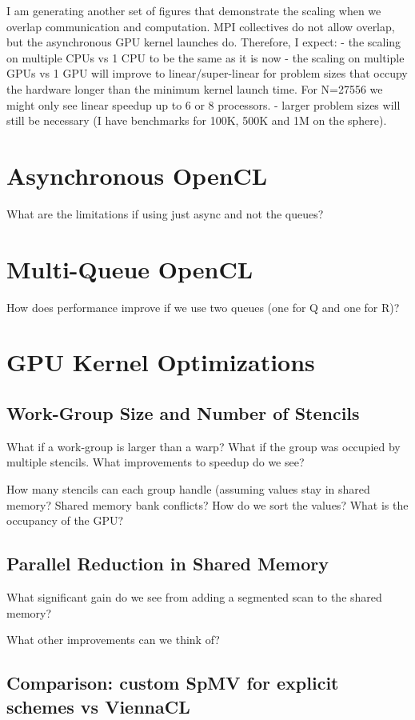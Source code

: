 I am generating another set of figures that demonstrate the scaling when we overlap communication and computation. MPI collectives do not allow overlap, but the asynchronous GPU kernel launches do. Therefore, I expect:
    - the scaling on multiple CPUs vs 1 CPU to be the same as it is now
    - the scaling on multiple GPUs vs 1 GPU will improve to linear/super-linear for problem sizes that occupy the hardware longer than the minimum kernel launch time. For N=27556 we might only see linear speedup up to 6 or 8 processors. 
    - larger problem sizes will still be necessary (I have benchmarks for 100K, 500K and 1M on the sphere).
    



\section{Asynchronous OpenCL}

What are the limitations if using just async and not the queues?

\section{Multi-Queue OpenCL}
How does performance improve if we use two queues (one for Q and one for R)? 

\section{GPU Kernel Optimizations}

\subsection{Work-Group Size and Number of Stencils}
What if a work-group is larger than a warp? What if the group was occupied by multiple stencils. What improvements to speedup do we see?

How many stencils can each group handle (assuming values stay in shared memory? 
Shared memory bank conflicts? How do we sort the values? 
What is the occupancy of the GPU?

\subsection{Parallel Reduction in Shared Memory}
What significant gain do we see from adding a segmented scan to the shared memory? 

What other improvements can we think of? 

\subsection{Comparison: custom SpMV for explicit schemes vs ViennaCL}
